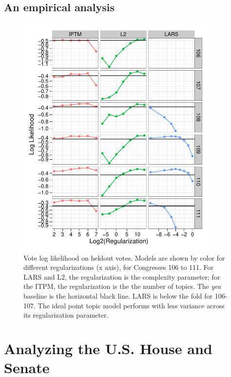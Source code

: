 \subsection{An empirical analysis}

\begin{figure}
\label{fig:log_likelihood}
\begin{center}
  \includegraphics[width=0.9\textwidth]
{chapter_spatial_voting_with_text/figures/138_log_likelihood_by_session_topics.pdf}
\end{center}
\vspace{-6pt}
\caption{Vote log likelihood on heldout votes. Models are shown
  by color for different regularizations (x axis), for Congresses 106
  to 111.  For LARS and L2, the regularization is the complexity
  parameter; for the ITPM, the regularization is the the number of
  topics.  The \emph{yea} baseline is the horizontal black line. LARS
  is below the fold for 106-107.  The ideal point topic model performs
  with less variance across its regularization parameter. }
\vspace{-3pt}
\end{figure}
\section{Analyzing the U.S. House and Senate}
\label{sec:experiments}

